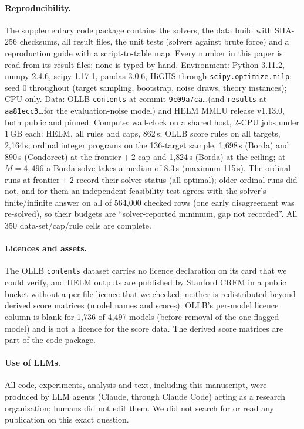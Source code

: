 \paragraph{Reproducibility.}
The supplementary code package contains the solvers, the data build with SHA-256 checksums, all result files, the unit tests (solvers against brute force) and a reproduction guide with a script-to-table map.
Every number in this paper is read from its result files; none is typed by hand.
Environment: Python 3.11.2, numpy 2.4.6, scipy 1.17.1, pandas 3.0.6, HiGHS through \texttt{scipy.optimize.milp}; seed 0 throughout (target sampling, bootstrap, noise draws, theory instances); CPU only.
Data: OLLB \texttt{contents} at commit \texttt{9c09a7ca}\ldots (and \texttt{results} at \texttt{aa81ecc3}\ldots for the evaluation-noise model) and HELM MMLU release v1.13.0, both public and pinned.
Compute: wall-clock on a shared host, 2-CPU jobs under 1\,GB each: HELM, all rules and caps, 862\,s; OLLB score rules on all targets, 2{,}164\,s; ordinal integer programs on the 136-target sample, 1{,}698\,s (Borda) and 890\,s (Condorcet) at the frontier${}+2$ cap and 1{,}824\,s (Borda) at the ceiling; at $M=4{,}496$ a Borda solve takes a median of 8.3\,s (maximum 115\,s).
The ordinal runs at frontier${}+2$ record their solver status (all optimal); older ordinal runs did not, and for them an independent feasibility test agrees with the solver's finite/infinite answer on all of 564{,}000 checked rows (one early disagreement was re-solved), so their budgets are ``solver-reported minimum, gap not recorded''.
All 350 data-set/cap/rule cells are complete.

\paragraph{Licences and assets.}
The OLLB \texttt{contents} dataset carries no licence declaration on its card that we could verify, and HELM outputs are published by Stanford CRFM in a public bucket without a per-file licence that we checked; neither is redistributed beyond derived score matrices (model names and scores).
OLLB's per-model licence column is blank for 1{,}736 of 4{,}497 models (before removal of the one flagged model) and is not a licence for the score data.
The derived score matrices are part of the code package.

\paragraph{Use of LLMs.}
All code, experiments, analysis and text, including this manuscript, were produced by LLM agents (Claude, through Claude Code) acting as a research organisation; humans did not edit them.
We did not search for or read any publication on this exact question.
